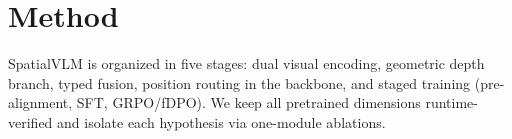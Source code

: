 \section{Method}
SpatialVLM is organized in five stages: dual visual encoding, geometric depth branch, typed fusion,
position routing in the backbone, and staged training (pre-alignment, SFT, GRPO/fDPO). We keep all
pretrained dimensions runtime-verified and isolate each hypothesis via one-module ablations.
